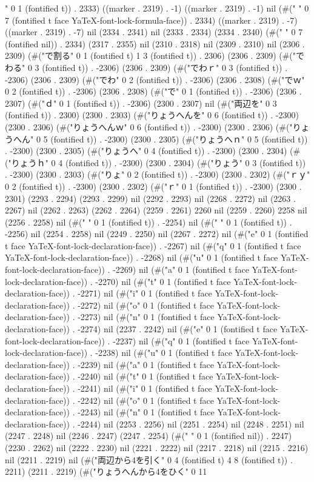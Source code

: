 " 0 1 (fontified t)) . 2333) ((marker . 2319) . -1) ((marker . 2319) . -1) nil (#("       " 0 7 (fontified t face YaTeX-font-lock-formula-face)) . 2334) ((marker . 2319) . -7) ((marker . 2319) . -7) nil (2334 . 2341) nil (2333 . 2334) (2334 . 2340) (#("       " 0 7 (fontified nil)) . 2334) (2317 . 2355) nil (2310 . 2318) nil (2309 . 2310) nil (2306 . 2309) (#("で割る" 0 1 (fontified t) 1 3 (fontified t)) . 2306) (2306 . 2309) (#("でわる" 0 3 (fontified t)) . -2306) (2306 . 2309) (#("でわｒ" 0 3 (fontified t)) . -2306) (2306 . 2309) (#("でわ" 0 2 (fontified t)) . -2306) (2306 . 2308) (#("でｗ" 0 2 (fontified t)) . -2306) (2306 . 2308) (#("で" 0 1 (fontified t)) . -2306) (2306 . 2307) (#("ｄ" 0 1 (fontified t)) . -2306) (2300 . 2307) nil (#("両辺を" 0 3 (fontified t)) . 2300) (2300 . 2303) (#("りょうへんを" 0 6 (fontified t)) . -2300) (2300 . 2306) (#("りょうへんｗ" 0 6 (fontified t)) . -2300) (2300 . 2306) (#("りょうへん" 0 5 (fontified t)) . -2300) (2300 . 2305) (#("りょうへｎ" 0 5 (fontified t)) . -2300) (2300 . 2305) (#("りょうへ" 0 4 (fontified t)) . -2300) (2300 . 2304) (#("りょうｈ" 0 4 (fontified t)) . -2300) (2300 . 2304) (#("りょう" 0 3 (fontified t)) . -2300) (2300 . 2303) (#("りょ" 0 2 (fontified t)) . -2300) (2300 . 2302) (#("ｒｙ" 0 2 (fontified t)) . -2300) (2300 . 2302) (#("ｒ" 0 1 (fontified t)) . -2300) (2300 . 2301) (2293 . 2294) (2293 . 2299) nil (2292 . 2293) nil (2268 . 2272) nil (2263 . 2267) nil (2262 . 2263) (2262 . 2264) (2259 . 2261) 2260 nil (2259 . 2260) 2258 nil (2256 . 2258) nil (#(" " 0 1 (fontified t)) . -2254) nil (#(" " 0 1 (fontified t)) . -2256) nil (2254 . 2258) nil (2249 . 2250) nil (2267 . 2272) nil (#("e" 0 1 (fontified t face YaTeX-font-lock-declaration-face)) . -2267) nil (#("q" 0 1 (fontified t face YaTeX-font-lock-declaration-face)) . -2268) nil (#("u" 0 1 (fontified t face YaTeX-font-lock-declaration-face)) . -2269) nil (#("a" 0 1 (fontified t face YaTeX-font-lock-declaration-face)) . -2270) nil (#("t" 0 1 (fontified t face YaTeX-font-lock-declaration-face)) . -2271) nil (#("i" 0 1 (fontified t face YaTeX-font-lock-declaration-face)) . -2272) nil (#("o" 0 1 (fontified t face YaTeX-font-lock-declaration-face)) . -2273) nil (#("n" 0 1 (fontified t face YaTeX-font-lock-declaration-face)) . -2274) nil (2237 . 2242) nil (#("e" 0 1 (fontified t face YaTeX-font-lock-declaration-face)) . -2237) nil (#("q" 0 1 (fontified t face YaTeX-font-lock-declaration-face)) . -2238) nil (#("u" 0 1 (fontified t face YaTeX-font-lock-declaration-face)) . -2239) nil (#("a" 0 1 (fontified t face YaTeX-font-lock-declaration-face)) . -2240) nil (#("t" 0 1 (fontified t face YaTeX-font-lock-declaration-face)) . -2241) nil (#("i" 0 1 (fontified t face YaTeX-font-lock-declaration-face)) . -2242) nil (#("o" 0 1 (fontified t face YaTeX-font-lock-declaration-face)) . -2243) nil (#("n" 0 1 (fontified t face YaTeX-font-lock-declaration-face)) . -2244) nil (2253 . 2256) nil (2251 . 2254) nil (2248 . 2251) nil (2247 . 2248) nil (2246 . 2247) (2247 . 2254) (#("	" 0 1 (fontified nil)) . 2247) (2230 . 2262) nil (2222 . 2230) nil (2221 . 2222) nil (2217 . 2218) nil (2215 . 2216) nil (2211 . 2219) nil (#("両辺から4を引く" 0 4 (fontified t) 4 8 (fontified t)) . 2211) (2211 . 2219) (#("りょうへんから4をひく" 0 11 